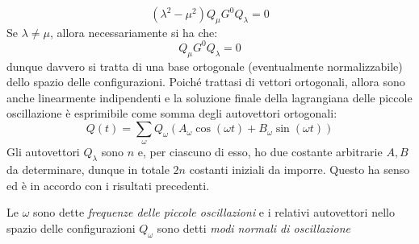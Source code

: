 \documentclass[a4paper,openany]{article}
\begin{document}
$$
(\lambda^2-\mu^2)Q_{\mu} G^0 Q_{\lambda} = 0
$$
Se $\lambda \neq \mu$, allora necessariamente si ha che:
\begin{equation}\label{key}
	Q_{\mu} G^0 Q_{\lambda} = 0
\end{equation}
dunque davvero si tratta di una base ortogonale (eventualmente normalizzabile) dello spazio delle configurazioni. Poiché trattasi di vettori ortogonali, allora sono anche linearmente indipendenti e la soluzione finale della lagrangiana delle piccole oscillazione è esprimibile come somma degli autovettori ortogonali:
	\begin{equation}\label{key}
		Q(t) = \sum_{\omega}Q_{\omega}(A_{\omega}\cos(\omega t)+B_{\omega}\sin(\omega t))
	\end{equation}
	Gli autovettori $Q_{\lambda}$ sono $n$ e, per ciascuno di esso, ho due costante arbitrarie $A,B$ da determinare, dunque in totale $2n$ costanti iniziali da imporre. Questo ha senso ed è in accordo con i risultati precedenti.
	
	Le $\omega$ sono dette \textit{frequenze delle piccole oscillazioni} e i relativi autovettori nello spazio delle configurazioni $Q_{\omega}$ sono detti \textit{modi normali di oscillazione}
\end{document}
